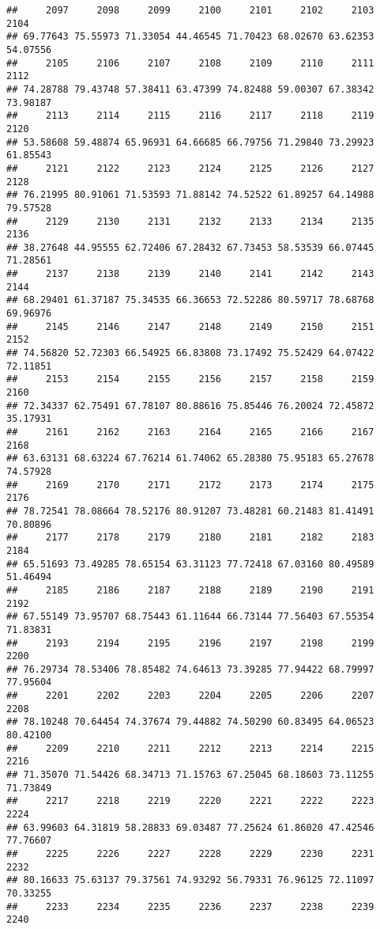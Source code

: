 \documentclass[
]{article}
\begin{document}
\begin{verbatim}
##     2097     2098     2099     2100     2101     2102     2103     2104 
## 69.77643 75.55973 71.33054 44.46545 71.70423 68.02670 63.62353 54.07556 
##     2105     2106     2107     2108     2109     2110     2111     2112 
## 74.28788 79.43748 57.38411 63.47399 74.82488 59.00307 67.38342 73.98187 
##     2113     2114     2115     2116     2117     2118     2119     2120 
## 53.58608 59.48874 65.96931 64.66685 66.79756 71.29840 73.29923 61.85543 
##     2121     2122     2123     2124     2125     2126     2127     2128 
## 76.21995 80.91061 71.53593 71.88142 74.52522 61.89257 64.14988 79.57528 
##     2129     2130     2131     2132     2133     2134     2135     2136 
## 38.27648 44.95555 62.72406 67.28432 67.73453 58.53539 66.07445 71.28561 
##     2137     2138     2139     2140     2141     2142     2143     2144 
## 68.29401 61.37187 75.34535 66.36653 72.52286 80.59717 78.68768 69.96976 
##     2145     2146     2147     2148     2149     2150     2151     2152 
## 74.56820 52.72303 66.54925 66.83808 73.17492 75.52429 64.07422 72.11851 
##     2153     2154     2155     2156     2157     2158     2159     2160 
## 72.34337 62.75491 67.78107 80.88616 75.85446 76.20024 72.45872 35.17931 
##     2161     2162     2163     2164     2165     2166     2167     2168 
## 63.63131 68.63224 67.76214 61.74062 65.28380 75.95183 65.27678 74.57928 
##     2169     2170     2171     2172     2173     2174     2175     2176 
## 78.72541 78.08664 78.52176 80.91207 73.48281 60.21483 81.41491 70.80896 
##     2177     2178     2179     2180     2181     2182     2183     2184 
## 65.51693 73.49285 78.65154 63.31123 77.72418 67.03160 80.49589 51.46494 
##     2185     2186     2187     2188     2189     2190     2191     2192 
## 67.55149 73.95707 68.75443 61.11644 66.73144 77.56403 67.55354 71.83831 
##     2193     2194     2195     2196     2197     2198     2199     2200 
## 76.29734 78.53406 78.85482 74.64613 73.39285 77.94422 68.79997 77.95604 
##     2201     2202     2203     2204     2205     2206     2207     2208 
## 78.10248 70.64454 74.37674 79.44882 74.50290 60.83495 64.06523 80.42100 
##     2209     2210     2211     2212     2213     2214     2215     2216 
## 71.35070 71.54426 68.34713 71.15763 67.25045 68.18603 73.11255 71.73849 
##     2217     2218     2219     2220     2221     2222     2223     2224 
## 63.99603 64.31819 58.28833 69.03487 77.25624 61.86020 47.42546 77.76607 
##     2225     2226     2227     2228     2229     2230     2231     2232 
## 80.16633 75.63137 79.37561 74.93292 56.79331 76.96125 72.11097 70.33255 
##     2233     2234     2235     2236     2237     2238     2239     2240 

\end{verbatim}
\end{document}
